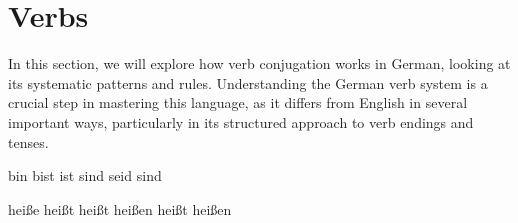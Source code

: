 \section{Verbs}\label{sec:verbs}

In this section, we will explore how verb conjugation works in German, looking at its systematic patterns and rules. Understanding the German verb system is a crucial step in mastering this language, as it differs from English in several important ways, particularly in its structured approach to verb endings and tenses.

{bin}
{bist}
{ist}
{sind}
{seid}
{sind}

{hei\ss{}e}
{hei\ss{}t}
{hei\ss{}t}
{hei\ss{}en}
{hei\ss{}t}
{hei\ss{}en}